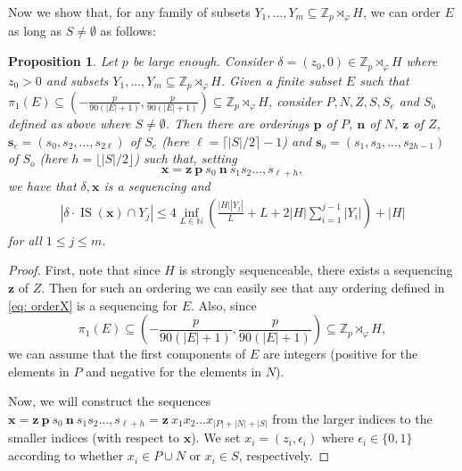 \documentclass[11pt]{amsart}
\newtheorem{proposition}[theorem]{Proposition}
\theoremstyle{definition}
\newcommand{\bp}{\mathbf{p}}
\newcommand{\bn}{\mathbf{n}}
\newcommand{\bx}{\mathbf{x}}
\newcommand{\bs}{\mathbf{s}}
\DeclareMathOperator{\IS}{IS}
\begin{document}
Now we show that, for any family of subsets $Y_1, \ldots, Y_m\subseteq \mathbb{Z}_{p} \rtimes_{\varphi} H$, we can order $E$ as long as $S \neq \emptyset$ as follows:
\begin{proposition}\label{prop:ordering-P-N} Let $p$ be large enough. Consider $\delta=(z_0,0)\in \mathbb{Z}_{p} \rtimes_{\varphi} H$ where  $z_0>0$ and subsets $Y_1, \ldots, Y_m \subseteq \mathbb{Z}_{p} \rtimes_{\varphi} H$. Given a finite subset $E$ such that $\pi_1(E)\subseteq\left(-\frac{p}{90(|E|+1)},\frac{p}{90(|E|+1)}\right)\subseteq \mathbb{Z}_{p} \rtimes_{\varphi} H$,  consider $P,N,Z,S,S_e$ and $S_o$ defined as above where $S \neq \emptyset$.
 Then there are orderings $\bp$ of $P$, $\bn$ of $N$, $\mathbf{z}$ of $Z$, $\bs_e=(s_0,s_2,\dots,s_{2\ell})$ of $S_e$ (here $\ell= \lceil |S|/2\rceil-1$) and $\bs_o=(s_1,s_3,\dots,s_{2h-1})$ of $S_o$ (here $h=\lfloor |S|/2\rfloor$) such that, setting
\begin{equation}\label{eq: orderX}\bx= \mathbf{z}\ \bp\  s_0\  \bn\  s_1s_2\dots,s_{\ell+h},\end{equation}
we have that $\delta, \bx$ is a sequencing and
\begin{align}\label{ISp-bound}
|\delta\cdot\IS(\bx) \cap Y_j| \leq 4\inf_{L \in \mathbb{N}} \left(\frac{|H| |Y_j|}{L}+L+2|H|\sum_{i=1}^{j-1}|Y_i|\right) + |H|
\end{align}
for all $1 \leq j \leq m$.
\end{proposition}\begin{proof}
First, note that since $H$ is strongly sequenceable, there exists a sequencing $\mathbf{z}$ of $Z$. Then for such an ordering we can easily see that any ordering defined in \eqref{eq: orderX} is a sequencing for $E$.  Also, since $$\pi_1(E)\subseteq\left(-\frac{p}{90(|E|+1)},\frac{p}{90(|E|+1)}\right)\subseteq \mathbb{Z}_{p} \rtimes_{\varphi} H,$$ we can assume that the first components of $E$ are integers (positive for the elements in $P$ and negative for the elements in $N$).

Now, we will construct the sequences $\bx= \mathbf{z}\ \bp\  s_0\ \bn\  s_1s_2\dots,s_{\ell+h}= \mathbf{z}\ x_1x_2\dots x_{|P|+|N|+|S|}$ from the larger indices to the smaller indices (with respect to $\bx$). We set $x_i=(z_i,\epsilon_i)$ where $\epsilon_i\in \{0,1\}$ according to whether $x_i\in P\cup N$ or $x_i\in S$, respectively.


\end{proof}
\end{document}
